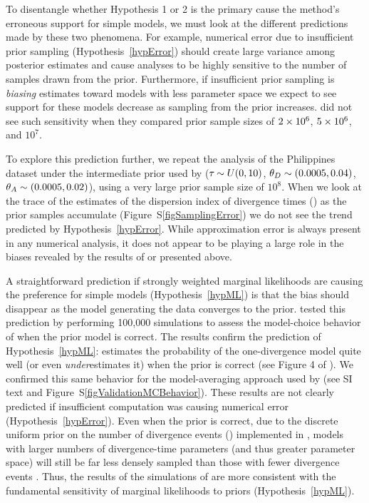 To disentangle whether Hypothesis 1 or 2 is the primary cause the method's
erroneous support for simple models, we must look at the different predictions
made by these two phenomena.
For example, numerical error due to insufficient prior sampling
(Hypothesis~\ref{hypError}) should create large variance among posterior
estimates and cause analyses to be highly sensitive to the number of samples
drawn from the prior.
Furthermore, if insufficient prior sampling is \emph{biasing} estimates toward
models with less parameter space we expect to see support for these models
decrease as sampling from the prior increases.
\citet{Oaks2012} did not see such sensitivity when they compared prior sample
sizes of $2\times 10^{6}$, $5\times 10^{6}$, and $10^7$.

To explore this prediction further, we repeat the analysis of the Philippines
dataset under the intermediate prior used by \citet{Oaks2012} ($\tau_{} \sim
U(0, 10)$, $\meanDescendantTheta{} \sim (0.0005, 0.04)$, $\ancestralTheta{}
\sim (0.0005, 0.02)$), using a very large prior sample size of $10^8$.
When we look at the trace of the estimates of the dispersion index of
divergence times (\vmratio{}) as the prior samples accumulate
(Figure~S\ref{figSamplingError}) we do not see the trend predicted by
Hypothesis~\ref{hypError}.
While approximation error is always present in any numerical analysis, it does
not appear to be playing a large role in the biases revealed by the results of
\citet{Oaks2012} or presented above.

A straightforward prediction if strongly weighted marginal likelihoods are
causing the preference for simple models (Hypothesis~\ref{hypML}) is that the
bias should disappear as the model generating the data converges to the prior.
\citet{Oaks2012} tested this prediction by performing 100,000 simulations to
assess the model-choice behavior of \msb when the prior model is correct.
The results confirm the prediction of Hypothesis~\ref{hypML}:
\msb estimates the probability of the one-divergence model quite well (or even
\emph{under}estimates it) when the prior is correct (see Figure 4 of
\citet{Oaks2012}).
We confirmed this same behavior for the model-averaging approach used by
\citet{Hickerson2013} (see SI text and Figure~S\ref{figValidationMCBehavior}).
These results are not clearly predicted if insufficient computation was causing
numerical error (Hypothesis~\ref{hypError}).
Even when the prior is correct, due to the discrete uniform prior on the number
of divergence events (\numt{}) implemented in \msb, models with larger numbers
of divergence-time parameters (and thus greater parameter space) will still be
far less densely sampled than those with fewer divergence events
\citep{Oaks2012}.
Thus, the results of the simulations of \citet{Oaks2012} are more consistent
with the fundamental sensitivity of marginal likelihoods to priors
(Hypothesis~\ref{hypML}).

